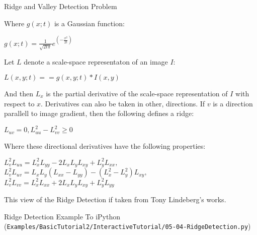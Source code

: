 \begin{frame}{Ridge and Valley Detection Problem}

Where $g(x;t)$ is a Gaussian function:\\
\center
\begin{center}
$g(x;t) = \frac{ 1 }{ \sqrt{ 2 t \pi } } e^{ \left( - \frac{x^2}{ 2 t} \right) }$ \\
\end{center}
Let $L$ denote a scale-space representaton of an image $I$:\\
\center
\begin{center}
$L(x,y;t) = = g(x,y; t) \ast I(x,y)$\\
\end{center}
And then $L_x$ is the partial derivative of the scale-space
representation of $I$ with respect  to $x$. Derivatives can also be
taken in other, directions. If $v$ is a direction parallell to image
gradient, then the following  defines a ridge:\\
\center
\begin{center}
$L_{uv} = 0, L_{uu}^2-L^2_{vv} \ge 0$
\end{center}

Where these directional derivatives have the following properties:
\center
\begin{center}
$L_v^2L_{uu}=L_x^2L_{yy}-2L_xL_yL_{xy}+L_y^2L_{xx},$\\
$L_v^2L_{uv}=L_xL_y(L_{xx}-L_{yy}) - (L_x^2-L_y^2)L_{xy},$\\
$L_v^2L_{vv}=L_x^2L_{xx}+2L_xL_yL_{xy} +L_y^2L_{yy}$\\
\end{center}

This view of the Ridge Detection if taken from Tony Lindeberg's works.

\end{frame}

\begin{frame}{Ridge Detection Example}
To iPython (\texttt{Examples/BasicTutorial2/InteractiveTutorial/05-04-RidgeDetection.py})
\end{frame}




